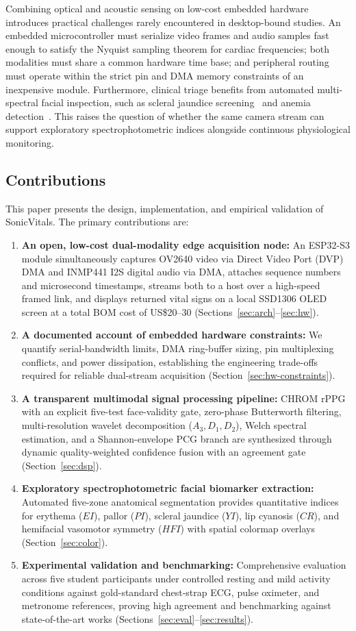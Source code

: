 \documentclass[journal]{IEEEtran}
\begin{document}
Combining optical and acoustic sensing on low-cost embedded hardware introduces practical challenges rarely encountered in desktop-bound studies. An embedded microcontroller must serialize video frames and audio samples fast enough to satisfy the Nyquist sampling theorem for cardiac frequencies; both modalities must share a common hardware time base; and peripheral routing must operate within the strict pin and DMA memory constraints of an inexpensive module. Furthermore, clinical triage benefits from automated multi-spectral facial inspection, such as scleral jaundice screening~\cite{mariakakis2017biliscreen} and anemia detection~\cite{mannino2018anemia}. This raises the question of whether the same camera stream can support exploratory spectrophotometric indices alongside continuous physiological monitoring.

\subsection{Contributions}
This paper presents the design, implementation, and empirical validation of SonicVitals. The primary contributions are:
\begin{enumerate}
  \item \textbf{An open, low-cost dual-modality edge acquisition node:} An ESP32-S3 module simultaneously captures OV2640 video via Direct Video Port (DVP) DMA and INMP441 I2S digital audio via DMA, attaches sequence numbers and microsecond timestamps, streams both to a host over a high-speed framed link, and displays returned vital signs on a local SSD1306 OLED screen at a total BOM cost of US\$20--30 (Sections~\ref{sec:arch}--\ref{sec:hw}).
  \item \textbf{A documented account of embedded hardware constraints:} We quantify serial-bandwidth limits, DMA ring-buffer sizing, pin multiplexing conflicts, and power dissipation, establishing the engineering trade-offs required for reliable dual-stream acquisition (Section~\ref{sec:hw-constraints}).
  \item \textbf{A transparent multimodal signal processing pipeline:} CHROM rPPG with an explicit five-test face-validity gate, zero-phase Butterworth filtering, multi-resolution wavelet decomposition ($A_3, D_1, D_2$), Welch spectral estimation, and a Shannon-envelope PCG branch are synthesized through dynamic quality-weighted confidence fusion with an agreement gate (Section~\ref{sec:dsp}).
  \item \textbf{Exploratory spectrophotometric facial biomarker extraction:} Automated five-zone anatomical segmentation provides quantitative indices for erythema ($EI$), pallor ($PI$), scleral jaundice ($YI$), lip cyanosis ($CR$), and hemifacial vasomotor symmetry ($HFI$) with spatial colormap overlays (Section~\ref{sec:color}).
  \item \textbf{Experimental validation and benchmarking:} Comprehensive evaluation across five student participants under controlled resting and mild activity conditions against gold-standard chest-strap ECG, pulse oximeter, and metronome references, proving high agreement and benchmarking against state-of-the-art works (Sections~\ref{sec:eval}--\ref{sec:results}).
\end{enumerate}
\end{document}
